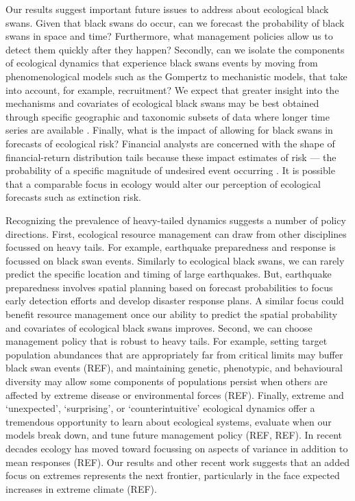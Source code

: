 Our results suggest important future issues to address about ecological black
swans. Given that black swans do occur, can we forecast the probability of
black swans in space and time? Furthermore, what management policies allow us
to detect them quickly after they happen? Secondly, can we isolate the
components of ecological dynamics that experience black swans events by moving
from phenomenological models such as the Gompertz to mechanistic models, that
take into account, for example, recruitment? We expect that greater insight
into the mechanisms and covariates of ecological black swans may be best
obtained through specific geographic and taxonomic subsets of data where longer
time series are available \citep[e.g.][]{segura2013}. Finally, what is the
impact of allowing for black swans in forecasts of ecological risk? Financial
analysts are concerned with the shape of financial-return distribution tails
because these impact estimates of risk --- the probability of a specific
magnitude of undesired event occurring \citep{rachev2008}. It is possible that
a comparable focus in ecology would alter our perception of ecological
forecasts such as extinction risk.

Recognizing the prevalence of heavy-tailed dynamics suggests a number of policy
directions. First, ecological resource management can draw from other
disciplines focussed on heavy tails. For example, earthquake preparedness and
response is focussed on black swan events. Similarly to ecological black swans,
we can rarely predict the specific location and timing of large earthquakes.
But, earthquake preparedness involves spatial planning based on forecast
probabilities to focus early detection efforts and develop disaster response
plans. A similar focus could benefit resource management once our ability to
predict the spatial probability and covariates of ecological black swans
improves. Second, we can choose management policy that is robust to heavy
tails. For example, setting target population abundances that are appropriately
far from critical limits may buffer black swan events (REF), and
maintaining genetic, phenotypic, and behavioural diversity may allow some
components of populations persist when others are affected by extreme disease
or environmental forces (REF). Finally, extreme and `unexpected', `surprising', or
`counterintuitive' ecological dynamics offer a tremendous opportunity to learn
about ecological systems, evaluate when our models break down, and tune future
management policy (REF, REF). In recent decades ecology has moved toward
focussing on aspects of variance in addition to mean responses (REF). Our
results and other recent work suggests that an added focus on extremes
represents the next frontier, particularly in the face expected increases in
extreme climate (REF).

